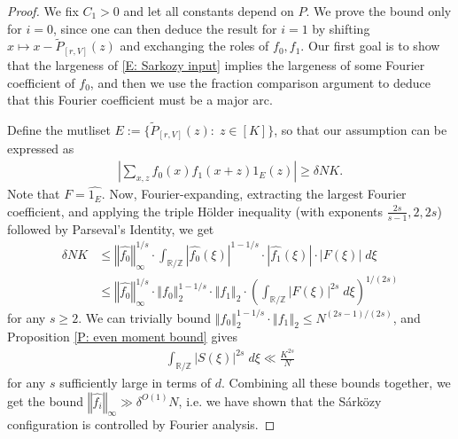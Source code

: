 \documentclass[11pt]{amsart}
\theoremstyle{definition}
\newcommand{\R}{{\mathbb R}}
\newcommand{\Z}{{\mathbb Z}}
\newcommand{\norm}[1]{\left\Vert #1\right\Vert}
\newcommand{\abs}[1]{\mathopen{}\left| #1\mathclose{}\right|}
\newcommand{\brac}[1]{\mathopen{}\left( #1 \mathclose{}\right)}
\begin{document}
\begin{proof}
    We fix $C_1>0$ and let all constants depend on $P$.
    We prove the bound only for $i=0$, since one can then deduce the result for $i=1$ by shifting $x \mapsto x-\widetilde{P}_{[r, V]}(z)$ and exchanging the roles of $f_0,f_1$. Our first goal is to show that the largeness of \eqref{E: Sarkozy input} implies the largeness of some Fourier coefficient of $f_0$, and then we use the fraction comparison argument to deduce that this Fourier coefficient must be a major arc.
    
    Define the mutliset $E:= \{\widetilde{P}_{[r, V]}(z):\; z\in[K]\}$, so that our assumption can be expressed as
    \begin{align*}
        \abs{\sum_{x,z}f_0(x) f_1(x+z)1_E(z)}\geq \delta NK.
    \end{align*}
  Note that $F = \widehat{1_E}$.  Now, Fourier-expanding, extracting the largest Fourier coefficient, and applying the triple H\"older inequality (with exponents $\frac{2s}{s-1}, 2, 2s$) followed by Parseval's Identity,
    we get
    \begin{align*}
        \delta N K &\leq \norm{\widehat{f_0}}_\infty^{1/s}\cdot \int_{\R/\Z}|\widehat{f_0}(\xi)|^{1-1/s}\cdot|\widehat{f_1}(\xi)|\cdot|F(\xi)|\; d\xi\\
        &\leq \norm{\widehat{f_0}}_\infty^{1/s}\cdot \norm{f_0}^{1-1/s}_2 \cdot \norm{f_1}_2 \cdot \brac{\int_{\R/\Z}|F(\xi)|^{2s}\; d\xi}^{1/(2s)}
    \end{align*}
    for any $s\geq 2$.
    We can trivially bound $\norm{f_0}^{1-1/s}_2 \cdot \norm{f_1}_2\leq N^{(2s-1)/(2s)}$, and Proposition \ref{P: even moment bound} gives
    \begin{align*}
        \int_{\R/\Z}|S(\xi)|^{2s}\; d\xi \ll \frac{K^{2s}}{N}
    \end{align*}
    for any $s$ sufficiently large in terms of $d$.
    Combining all these bounds together, we get the bound $\norm{\widehat{f_i}}_\infty\gg \delta^{O(1)} N$, i.e. we have shown that the S\'ark\"ozy configuration is controlled by Fourier analysis. 


\end{proof}
\end{document}
